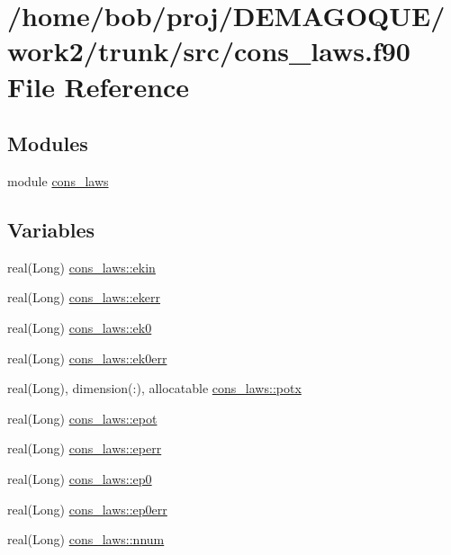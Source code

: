 \hypertarget{cons__laws_8f90}{
\section{/home/bob/proj/DEMAGOQUE/work2/trunk/src/cons\_\-laws.f90 File Reference}
\label{cons__laws_8f90}
}
\subsection*{Modules}
\begin{DoxyCompactItemize}
\item 
module \hyperlink{namespacecons__laws}{cons\_\-laws}
\end{DoxyCompactItemize}
\subsection*{Variables}
\begin{DoxyCompactItemize}
\item 
real(Long) \hyperlink{namespacecons__laws_a8d6ef7d1726b52d17e21c62607c22c3b}{cons\_\-laws::ekin}
\item 
real(Long) \hyperlink{namespacecons__laws_aaaca27b785c52ee051b7f12c73182924}{cons\_\-laws::ekerr}
\item 
real(Long) \hyperlink{namespacecons__laws_a1a3384f3d97911851a7c728ae1cd8af7}{cons\_\-laws::ek0}
\item 
real(Long) \hyperlink{namespacecons__laws_a2d6e39be272e86946cd52d0596c6bc3a}{cons\_\-laws::ek0err}
\item 
real(Long), dimension(:), allocatable \hyperlink{namespacecons__laws_a5e16e552d92dd5dd52c3cdc8600e62fe}{cons\_\-laws::potx}
\item 
real(Long) \hyperlink{namespacecons__laws_a63e2f83fe00d6af9a68267f70281beac}{cons\_\-laws::epot}
\item 
real(Long) \hyperlink{namespacecons__laws_a1fa58c36c9b57ed4261fddafdadfb924}{cons\_\-laws::eperr}
\item 
real(Long) \hyperlink{namespacecons__laws_a1241ed7a0d2ec35982d18efa725fd588}{cons\_\-laws::ep0}
\item 
real(Long) \hyperlink{namespacecons__laws_a9552ba8aaa6ba5048797e3dcabad3eb4}{cons\_\-laws::ep0err}
\item 
real(Long) \hyperlink{namespacecons__laws_ac8202a23f94b9d534dfc7d5169d2e4bf}{cons\_\-laws::nnum}
\end{DoxyCompactItemize}
